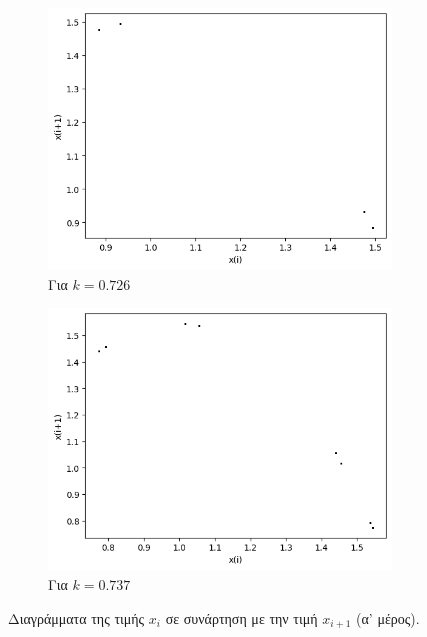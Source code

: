 \begin{figure}[ht]
\begin{subfigure}[b]{0.4\textwidth}
		\includegraphics[width=\textwidth]{LateX images/graphs q14/g15}
		\caption{Για $k=0.726$}
		\label{f:k72}
	\end{subfigure}
	\hfill
	\begin{subfigure}[b]{0.4\textwidth}
		\centering
		\includegraphics[width=\textwidth]{LateX images/graphs q14/g16}
		\caption{Για $k=0.737$}
		\label{f:k73}
	\end{subfigure}
	\hfill
	\caption{Διαγράμματα της τιμής \(x_i\) σε συνάρτηση με την τιμή \(x_{i+1}\) (α' μέρος).}
\end{figure}
